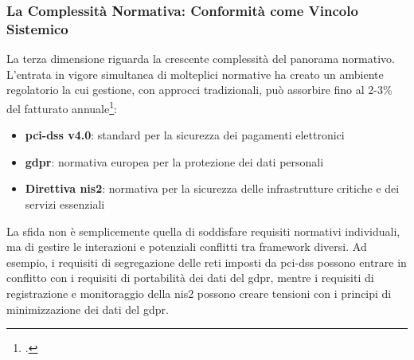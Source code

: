 \subsubsection{\texorpdfstring{La Complessità Normativa: Conformità come Vincolo Sistemico}{1.1.2.3 - La Complessità Normativa: Conformità come Vincolo Sistemico}}
\label{subsubsec:complessita_normativa}

La terza dimensione riguarda la crescente complessità del panorama normativo. L'entrata in vigore simultanea di molteplici normative ha creato un ambiente regolatorio la cui gestione, con approcci tradizionali, può assorbire fino al 2-3\% del fatturato annuale\footcite{ponemon2024compliance}:

\begin{itemize}
\item \textbf{\gls{pci-dss} v4.0}: standard per la sicurezza dei pagamenti elettronici
\item \textbf{\gls{gdpr}}: normativa europea per la protezione dei dati personali
\item \textbf{Direttiva \gls{nis2}}: normativa per la sicurezza delle infrastrutture critiche e dei servizi essenziali
\end{itemize}

La sfida non è semplicemente quella di soddisfare requisiti normativi individuali, ma di gestire le interazioni e potenziali conflitti tra framework diversi. Ad esempio, i requisiti di segregazione delle reti imposti da \gls{pci-dss} possono entrare in conflitto con i requisiti di portabilità dei dati del \gls{gdpr}, mentre i requisiti di registrazione e monitoraggio della \gls{nis2} possono creare tensioni con i principi di minimizzazione dei dati del \gls{gdpr}.

